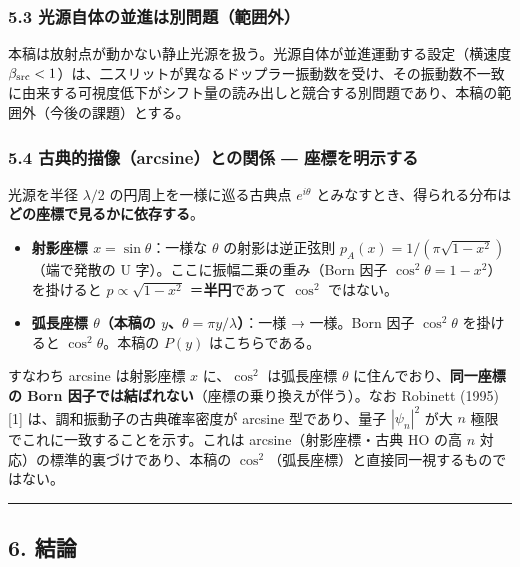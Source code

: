 \documentclass[
]{ltjsarticle}
\providecommand{\tightlist}{%
  \setlength{\itemsep}{0pt}\setlength{\parskip}{0pt}}
\begin{document}
\subsubsection{5.3
光源自体の並進は別問題（範囲外）}\label{ux5149ux6e90ux81eaux4f53ux306eux4e26ux9032ux306fux5225ux554fux984cux7bc4ux56f2ux5916}

本稿は放射点が動かない静止光源を扱う。光源自体が並進運動する設定（横速度
\(\beta_{\rm src}<1\)）は、二スリットが異なるドップラー振動数を受け、その振動数不一致に由来する可視度低下がシフト量の読み出しと競合する別問題であり、本稿の範囲外（今後の課題）とする。

\subsubsection{5.4 古典的描像（arcsine）との関係 ―
座標を明示する}\label{ux53e4ux5178ux7684ux63cfux50cfarcsineux3068ux306eux95a2ux4fc2-ux5ea7ux6a19ux3092ux660eux793aux3059ux308b}

光源を半径 \(\lambda/2\) の円周上を一様に巡る古典点 \(e^{i\theta}\)
とみなすとき、得られる分布は\textbf{どの座標で見るかに依存する}。

\begin{itemize}
\tightlist
\item
  \textbf{射影座標 \(x=\sin\theta\)}：一様な \(\theta\) の射影は逆正弦則
  \(p_A(x)=1/(\pi\sqrt{1-x^2})\)（端で発散の U
  字）。ここに振幅二乗の重み（Born 因子
  \(\cos^2\theta=1-x^2\)）を掛けると \(p\propto\sqrt{1-x^2}\)
  ＝\textbf{半円}であって \(\cos^2\) ではない。
\item
  \textbf{弧長座標 \(\theta\)（本稿の
  \(y\)、\(\theta=\pi y/\lambda\)）}：一様 → 一様。Born 因子
  \(\cos^2\theta\) を掛けると \(\cos^2\theta\)。本稿の \(P(y)\)
  はこちらである。
\end{itemize}

すなわち arcsine は射影座標 \(x\) に、\(\cos^2\) は弧長座標 \(\theta\)
に住んでおり、\textbf{同一座標の Born
因子では結ばれない}（座標の乗り換えが伴う）。なお Robinett (1995)
{[}1{]} は、調和振動子の古典確率密度が arcsine 型であり、量子
\(|\psi_n|^2\) が大 \(n\) 極限でこれに一致することを示す。これは
arcsine（射影座標・古典 HO の高 \(n\) 対応）の標準的裏づけであり、本稿の
\(\cos^2\)（弧長座標）と直接同一視するものではない。

\begin{center}\rule{0.5\linewidth}{0.5pt}\end{center}

\subsection{6. 結論}\label{ux7d50ux8ad6}
\end{document}
